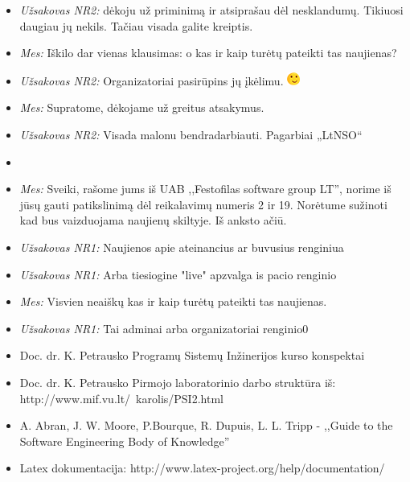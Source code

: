 \documentclass{VUMIFPSkursinis}
\begin{document}
\begin{itemize}
\begin{itemize}
					\item \textit{Užsakovas NR2:} dėkoju už priminimą ir atsiprašau dėl nesklandumų. Tikiuosi daugiau jų nekils. Tačiau visada galite kreiptis.
					\item \textit{Mes:} Iškilo dar vienas klausimas: o kas ir kaip turėtų pateikti tas naujienas?
					\item \textit{Užsakovas NR2:} Organizatoriai pasirūpins jų įkėlimu. \includegraphics{img/smile.png}
					\item \textit{Mes:} Supratome, dėkojame už greitus atsakymus.
					\item \textit{Užsakovas NR2:} Visada malonu bendradarbiauti. Pagarbiai „LtNSO“
					\item[ ]
					\item \textit{Mes:} Sveiki, rašome jums iš UAB ,,Festofilas software group LT'', norime iš jūsų gauti patikslinimą dėl reikalavimų numeris 2 ir 19. Norėtume sužinoti kad bus vaizduojama naujienų skiltyje. Iš anksto ačiū.
					\item \textit{Užsakovas NR1:} Naujienos apie ateinancius ar buvusius renginiua
					\item \textit{Užsakovas NR1:} Arba tiesiogine "live" apzvalga is pacio renginio
					\item \textit{Mes:} Visvien neaiškų kas ir kaip turėtų pateikti tas naujienas.
					\item \textit{Užsakovas NR1:} Tai adminai arba organizatoriai renginio0
				\end{itemize}
        \end{itemize}
     \label{literaturosSarasas}
        \begin{itemize}
			\item Doc. dr. K. Petrausko Programų Sistemų Inžinerijos kurso konspektai
			\item Doc. dr. K. Petrausko Pirmojo laboratorinio darbo struktūra iš: http://www.mif.vu.lt/~karolis/PSI2.html
			\item A. Abran, J. W. Moore, P.Bourque, R. Dupuis, L. L. Tripp - ,,Guide to the Software Engineering Body of Knowledge''
			\item Latex dokumentacija: http://www.latex-project.org/help/documentation/
        \end{itemize}
\end{document}
